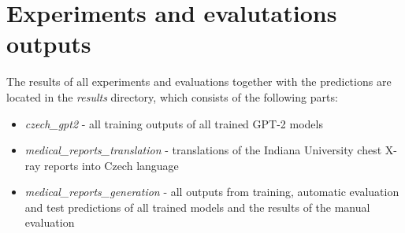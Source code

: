 \documentclass[12pt,a4paper]{report}
\let\openright=\clearpage
\begin{document}
\section{Experiments and evalutations outputs}
\label{add:Outputs}
The results of all experiments and evaluations together with the predictions are located in the \textit{results} directory, which consists of the following parts:
\begin{itemize}
	\item \textit{czech\_gpt2} - all training outputs of all trained GPT-2 models
	\item \textit{medical\_reports\_translation} - translations of the Indiana University chest X-ray reports into Czech language
	\item \textit{medical\_reports\_generation} - all outputs from training, automatic evaluation and test predictions of all trained models and the results of the manual evaluation
\end{itemize}

\openright
\end{document}
